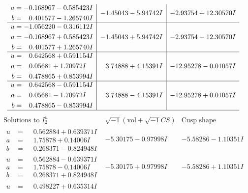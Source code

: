 \documentclass[1p]{elsarticle_modified}
\theoremstyle{definition}
\newcommand{\I}{\sqrt{-1}}
\begin{document}
$$\begin{array}{c|c|c}
\begin{aligned}
a &= -0.168967 - 0.585423 I \\
b &= \phantom{-}0.401577 - 1.265740 I\end{aligned}
 & -1.45043 - 5.94742 I & -2.93754 + 12.30570 I \\ \hline\begin{aligned}
u &= -1.056220 - 0.316112 I \\
a &= -0.168967 + 0.585423 I \\
b &= \phantom{-}0.401577 + 1.265740 I\end{aligned}
 & -1.45043 + 5.94742 I & -2.93754 - 12.30570 I \\ \hline\begin{aligned}
u &= \phantom{-}0.642568 + 0.591154 I \\
a &= \phantom{-}0.05681 + 1.70972 I \\
b &= \phantom{-}0.478865 + 0.853994 I\end{aligned}
 & \phantom{-}3.74888 + 4.15391 I & -12.95278 - 0.01057 I \\ \hline\begin{aligned}
u &= \phantom{-}0.642568 - 0.591154 I \\
a &= \phantom{-}0.05681 - 1.70972 I \\
b &= \phantom{-}0.478865 - 0.853994 I\end{aligned}
 & \phantom{-}3.74888 - 4.15391 I & -12.95278 + 0.01057 I\\
 \hline 
 \end{array}$$\newpage$$\begin{array}{c|c|c}  
\text{Solutions to }I^u_{2}& \I (\text{vol} + \sqrt{-1}CS) & \text{Cusp shape}\\
 \hline 
\begin{aligned}
u &= \phantom{-}0.562884 + 0.639371 I \\
a &= \phantom{-}1.75878 + 0.14006 I \\
b &= \phantom{-}0.268371 - 0.824948 I\end{aligned}
 & -5.30175 - 0.97998 I & -5.58286 - 1.10351 I \\ \hline\begin{aligned}
u &= \phantom{-}0.562884 - 0.639371 I \\
a &= \phantom{-}1.75878 - 0.14006 I \\
b &= \phantom{-}0.268371 + 0.824948 I\end{aligned}
 & -5.30175 + 0.97998 I & -5.58286 + 1.10351 I \\ \hline\begin{aligned}
u &= \phantom{-}0.498227 + 0.635314 I \\

\end{aligned}
\end{array}$$
\end{document}
